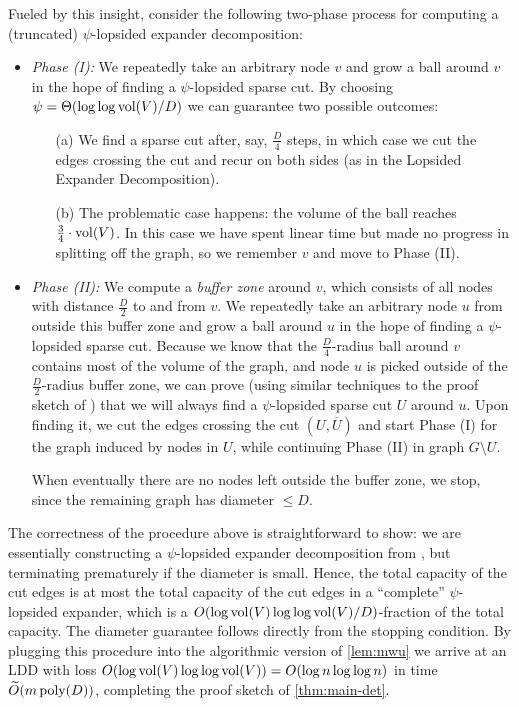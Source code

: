 \documentclass[letterpaper,11pt]{article}
\begin{document}
Fueled by this insight, consider the following two-phase process for computing a (truncated) $\psi$-lopsided expander decomposition:
\begin{itemize}
    \setlength\parindent{1.6em}
    \setlength\parskip{0pt}
 	\item \emph{Phase (I):} We repeatedly take an arbitrary node $v$ and grow a ball around $v$ in the hope of finding a $\psi$-lopsided sparse cut. By choosing $\psi = \Theta(\log\log \operatorname{vol}(V) / D)$ we can guarantee two possible outcomes: 
 	\begin{enumerate}
 		\item[(a)] We find a sparse cut after, say, $\frac{D}{4}$ steps, in which case we cut the edges crossing the cut and recur on both sides (as in the Lopsided Expander Decomposition).
 		\item[(b)] The problematic case happens: the volume of the ball reaches $\frac{3}{4} \cdot \operatorname{vol}(V)$. In this case we have spent linear time but made no progress in splitting off the graph, so we remember $v$ and move to Phase (II).
 	\end{enumerate}
	
 	\item \emph{Phase (II):} We compute a \emph{buffer zone} around $v$, which consists of all nodes with distance $\frac{D}{2}$ to and from $v$. We repeatedly take an arbitrary node $u$ from outside this buffer zone and grow a ball around $u$ in the hope of finding a $\psi$-lopsided sparse cut. Because we know that the $\frac{D}{4}$-radius ball around $v$ contains most of the volume of the graph, and node $u$ is picked outside of the $\frac{D}{2}$-radius buffer zone, we can prove (using similar techniques to the proof sketch of ) that we will always find a $\psi$-lopsided sparse cut $U$ around $u$. Upon finding it, we cut the edges crossing the cut $(U, \overline U)$ and start Phase (I) for the graph induced by nodes in $U$, while continuing Phase (II) in graph $G \setminus U$.
 	
 	When eventually there are no nodes left outside the buffer zone, we stop, since the remaining graph has diameter $\leq D$.
\end{itemize}

The correctness of the procedure above is straightforward to show: we are essentially constructing a $\psi$-lopsided expander decomposition from , but terminating prematurely if the diameter is small. Hence, the total capacity of the cut edges is at most the total capacity of the cut edges in a ``complete'' $\psi$-lopsided expander, which is a $O(\log \operatorname{vol}(V) \log\log \operatorname{vol}(V) / D)$-fraction of the total capacity. The diameter guarantee follows directly from the stopping condition. By plugging this procedure into the algorithmic version of \cref{lem:mwu} we arrive at an LDD with loss $O(\log \operatorname{vol}(V) \log\log \operatorname{vol}(V)) = O(\log n \log\log n)$ in time $\widetilde{O}(m \operatorname{\text{{\rm poly}}}(D))$, completing the proof sketch of \cref{thm:main-det}.
\end{document}
